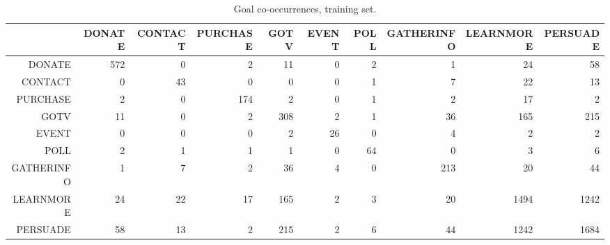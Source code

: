 \begin{table}[ht]
\centering
\begingroup\scriptsize
\begin{tabular}{rrrrrrrrrr}
  \hline
 & DONATE & CONTACT & PURCHASE & GOTV & EVENT & POLL & GATHERINFO & LEARNMORE & PERSUADE \\ 
  \hline
DONATE & 572 & 0 & 2 & 11 & 0 & 2 & 1 & 24 & 58 \\ 
  CONTACT & 0 & 43 & 0 & 0 & 0 & 1 & 7 & 22 & 13 \\ 
  PURCHASE & 2 & 0 & 174 & 2 & 0 & 1 & 2 & 17 & 2 \\ 
  GOTV & 11 & 0 & 2 & 308 & 2 & 1 & 36 & 165 & 215 \\ 
  EVENT & 0 & 0 & 0 & 2 & 26 & 0 & 4 & 2 & 2 \\ 
  POLL & 2 & 1 & 1 & 1 & 0 & 64 & 0 & 3 & 6 \\ 
  GATHERINFO & 1 & 7 & 2 & 36 & 4 & 0 & 213 & 20 & 44 \\ 
  LEARNMORE & 24 & 22 & 17 & 165 & 2 & 3 & 20 & 1494 & 1242 \\ 
  PERSUADE & 58 & 13 & 2 & 215 & 2 & 6 & 44 & 1242 & 1684 \\ 
   \hline
\end{tabular}
\endgroup
\caption{Goal co-occurrences, training set.} 
\label{tab:cooccurrences_train}
\end{table}
